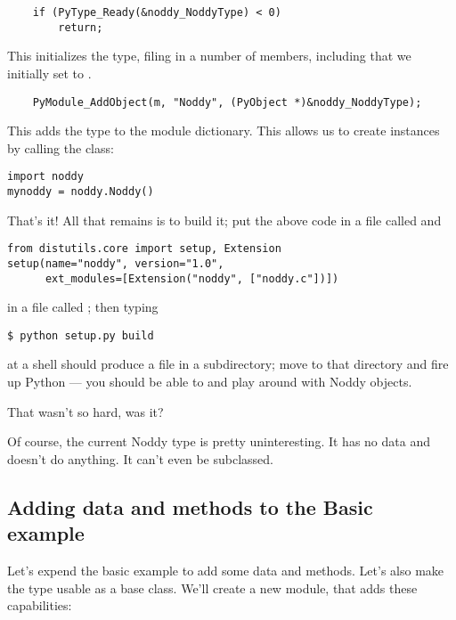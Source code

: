 \begin{verbatim}
    if (PyType_Ready(&noddy_NoddyType) < 0)
        return;
\end{verbatim}

This initializes the  type, filing in a number of
members, including  that we initially set to \NULL.

\begin{verbatim}
    PyModule_AddObject(m, "Noddy", (PyObject *)&noddy_NoddyType);
\end{verbatim}

This adds the type to the module dictionary.  This allows us to create
 instances by calling the  class:

\begin{verbatim}
import noddy
mynoddy = noddy.Noddy()
\end{verbatim}

That's it!  All that remains is to build it; put the above code in a
file called  and

\begin{verbatim}
from distutils.core import setup, Extension
setup(name="noddy", version="1.0",
      ext_modules=[Extension("noddy", ["noddy.c"])])
\end{verbatim}

in a file called ; then typing

\begin{verbatim}
$ python setup.py build
\end{verbatim} %

at a shell should produce a file  in a subdirectory;
move to that directory and fire up Python --- you should be able to
 and play around with Noddy objects.

That wasn't so hard, was it?

Of course, the current Noddy type is pretty uninteresting. It has no
data and doesn't do anything. It can't even be subclassed.

\subsection{Adding data and methods to the Basic example}
    
Let's expend the basic example to add some data and methods.  Let's
also make the type usable as a base class. We'll create
a new module,  that adds these capabilities:

